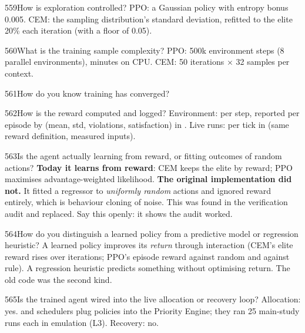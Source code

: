 \begin{qa}{559}{How is exploration controlled?}
PPO: a Gaussian policy with entropy bonus 0.005. CEM: the sampling distribution's standard deviation, refitted to the
elite 20\% each iteration (with a floor of 0.05).
\end{qa}

\begin{qa}{560}{What is the training sample complexity?}
PPO: 500k environment steps (8 parallel environments), minutes on CPU. CEM: 50 iterations $\times$ 32 samples per
context.
\end{qa}

\begin{qa}{561}{How do you know training has converged?}
\end{qa}

\begin{qa}{562}{How is the reward computed and logged?}
Environment: per step, reported per episode by  (mean, std, violations, satisfaction) in
. Live runs: per tick in  (same reward definition, measured inputs).
\end{qa}

\begin{qa}{563}{Is the agent actually learning from reward, or fitting outcomes of random actions?}
\textbf{Today it learns from reward}: CEM keeps the elite by reward; PPO maximises advantage-weighted likelihood.
\textbf{The original implementation did not.} It fitted a regressor to \emph{uniformly random} actions and ignored
reward entirely, which is behaviour cloning of noise. This was found in the verification audit and replaced. Say this
openly: it shows the audit worked.
\end{qa}

\begin{qa}{564}{How do you distinguish a learned policy from a predictive model or regression heuristic?}
A learned policy improves its \emph{return} through interaction (CEM's elite reward rises over iterations; PPO's
episode reward against random and against rule). A regression heuristic predicts something without optimising
return. The old code was the second kind.
\end{qa}

\begin{qa}{565}{Is the trained agent wired into the live allocation or recovery loop?}
Allocation: yes.  and  schedulers plug policies into the Priority Engine; they ran 25 main-study
runs each in emulation (L3). Recovery: no.
\end{qa}


